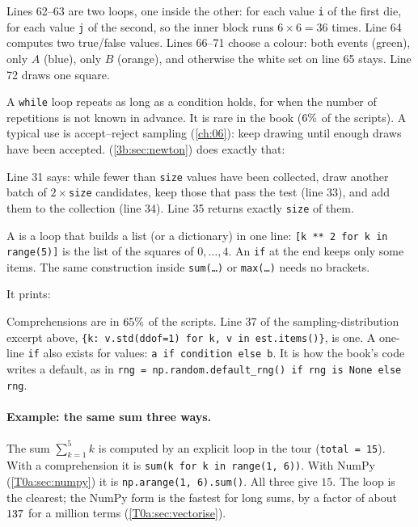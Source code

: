 Lines 62--63 are two loops, one inside the other: for each value \texttt{i} of the first die, for each value \texttt{j} of the second, so the inner block runs $6\times6=36$ times. Line 64 computes two true/false values. Lines 66--71 choose a colour: both events (green), only $A$ (blue), only $B$ (orange), and otherwise the white set on line 65 stays. Line 72 draws one square.

A \texttt{while} loop repeats as long as a condition holds, for when the number of repetitions is not known in advance. It is rare in the book ($6\%$ of the scripts). A typical use is accept--reject sampling (\cref{ch:06}): keep drawing until enough draws have been accepted.  (\cref{3b:sec:newton}) does exactly that:


Line 31 says: while fewer than \texttt{size} values have been collected, draw another batch of $2\times$\texttt{size} candidates, keep those that pass the test (line 33), and add them to the collection (line 34). Line 35 returns exactly \texttt{size} of them.

A  is a loop that builds a list (or a dictionary) in one line: \texttt{[k ** 2 for k in range(5)]} is the list of the squares of $0,\dots,4$. An \texttt{if} at the end keeps only some items. The same construction inside \texttt{sum(\dots)} or \texttt{max(\dots)} needs no brackets.

\noindent It prints:

Comprehensions are in $65\%$ of the scripts. Line 37 of the sampling-distribution excerpt above, \verb|{k: v.std(ddof=1) for k, v in est.items()}|, is one. A one-line \texttt{if} also exists for values: \texttt{a if condition else b}. It is how the book's code writes a default, as in \texttt{rng = np.random.default\_rng() if rng is None else rng}.

\paragraph{Example: the same sum three ways.} The sum $\sum_{k=1}^{5}k$ is computed by an explicit loop in the tour (\texttt{total = 15}). With a comprehension it is \texttt{sum(k for k in range(1, 6))}. With NumPy (\cref{T0a:sec:numpy}) it is \texttt{np.arange(1, 6).sum()}. All three give $15$. The loop is the clearest; the NumPy form is the fastest for long sums, by a factor of about $137$ for a million terms (\cref{T0a:sec:vectorise}).

